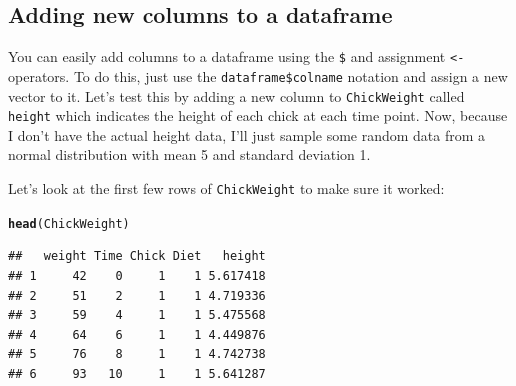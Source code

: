 \documentclass{tufte-book}\usepackage[]{graphicx}\usepackage[]{color}
\makeatletter
\newcommand{\hlnum}[1]{\textcolor[rgb]{0.686,0.059,0.569}{#1}}%
\newcommand{\hlopt}[1]{\textcolor[rgb]{0,0,0}{#1}}%
\newcommand{\hlstd}[1]{\textcolor[rgb]{0.345,0.345,0.345}{#1}}%
\newcommand{\hlkwb}[1]{\textcolor[rgb]{0.69,0.353,0.396}{#1}}%
\newcommand{\hlkwc}[1]{\textcolor[rgb]{0.333,0.667,0.333}{#1}}%
\newcommand{\hlkwd}[1]{\textcolor[rgb]{0.737,0.353,0.396}{\textbf{#1}}}%
\newenvironment{kframe}{%
 \def\at@end@of@kframe{}%
 \ifinner\ifhmode%
  \def\at@end@of@kframe{\end{minipage}}%
  \begin{minipage}{\columnwidth}%
 \fi\fi%
 \def\FrameCommand##1{\hskip\@totalleftmargin \hskip-\fboxsep
 \colorbox{shadecolor}{##1}\hskip-\fboxsep
     \hskip-\linewidth \hskip-\@totalleftmargin \hskip\columnwidth}%
 \MakeFramed {\advance\hsize-\width
   \@totalleftmargin\z@ \linewidth\hsize
   \@setminipage}}%
 {\par\unskip\endMakeFramed%
 \at@end@of@kframe}
\newenvironment{knitrout}{}{} %
\makeatother
\begin{document}
\begin{footnotesize}
\section{Adding new columns to a dataframe}

You can easily add columns to a dataframe using the \texttt{\$} and assignment \texttt{<-} operators. To do this, just use the \texttt{dataframe\$colname} notation and assign a new vector to it. Let's test this by adding a new column to \texttt{ChickWeight} called \texttt{height} which indicates the height of each chick at each time point. Now, because I don't have the actual height data, I'll just sample some random data from a normal distribution with mean 5 and standard deviation 1.


Let's look at the first few rows of \texttt{ChickWeight} to make sure it worked:

\begin{footnotesize}
\begin{knitrout}
\color{fgcolor}\begin{kframe}
\begin{alltt}
\hlkwd{head}\hlstd{(ChickWeight)}
\end{alltt}
\begin{verbatim}
##   weight Time Chick Diet   height
## 1     42    0     1    1 5.617418
## 2     51    2     1    1 4.719336
## 3     59    4     1    1 5.475568
## 4     64    6     1    1 4.449876
## 5     76    8     1    1 4.742738
## 6     93   10     1    1 5.641287
\end{verbatim}
\end{kframe}
\end{knitrout}
\end{footnotesize}


\end{footnotesize}
\end{document}
